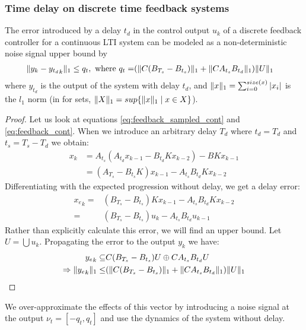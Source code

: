 \documentclass[sigconf]{llncs}
\DeclarePairedDelimiter\norm{\lVert}{\rVert}
\newcommand{\mat}[1]{{#1}}
\renewcommand{\vec}[1]{{#1}}
\begin{document}
\subsubsection{Time delay on discrete time feedback systems} \label{sec:delay}
\begin{theorem}
The error introduced by a delay $t_d$ in the control output $\vec{u}_k$ of a discrete feedback controller for a continuous LTI system can be modeled as a non-deterministic noise signal upper bound by 
\begin{align}
\norm{\vec{y}_{k}-{\vec{y}_{t_d}}_{k}}_1 \leq q_t, \text{ where } q_t=&(\norm{\mat{C}(\mat{B}_{T_s}-\mat{B}_{t_s})}_1+\norm{\mat{C}\mat{A}_{t_s}\mat{B}_{t_d}}_1)\norm{U}_1
\end{align}
where $\vec{y}_{t_d}$ is the output of the system with delay $t_d$, and $\norm{\vec{x}}_1=\sum_{i=0}^{size(\vec{x})} |\vec{x}_i|$ is the $l_1$ norm (in for sets, $\norm{X}_1 = sup \{\norm{\vec{x}}_1 \mid \vec{x} \in X\}$). 
\end{theorem}

\begin{proof}
Let us look at equations \eqref{eq:feedback_sampled_cont} and
\eqref{eq:feedback_cont}.  When we introduce an arbitrary delay $T_d$ where
$t_d=T_d$ and $t_s=T_s-T_d$ we obtain:
%
\begin{align*}
\vec{x}_{k} &=\mat{A}_{t_s}(\mat{A}_{t_d}\vec{x}_{k-1}-\mat{B}_{t_d}\mat{K}\vec{x}_{k-2})-\mat{B}\mat{K}\vec{x}_{k-1}\nonumber\\
&=  (\mat{A}_{T_s}-\mat{B}_{t_s}\mat{K})\vec{x}_{k-1}-\mat{A}_{t_s}\mat{B}_{t_d}\mat{K}\vec{x}_{k-2}
\label{eq:delay_cont}
\end{align*}
%
Differentiating with the expected progression without delay, we get a delay
error:
%
\begin{align*}
{\vec{x}_e}_{k}=&(\mat{B}_{T_s}-\mat{B}_{t_s})\mat{K}\vec{x}_{k-1}-\mat{A}_{t_s}\mat{B}_{t_d}\mat{K}\vec{x}_{k-2}\nonumber\\
=&(\mat{B}_{T_s}-\mat{B}_{t_s})\vec{u}_{k}-\mat{A}_{t_s}\mat{B}_{t_d}\vec{u}_{k-1}
\end{align*}
Rather than explicitly calculate this error, we will find an upper bound. Let $U = \bigcup \vec{u}_k$. Propagating the error to the output $\vec{y}_k$ we have:
\begin{align*}
{\vec{y}_e}_{k} \subseteq &\mat{C}(\mat{B}_{T_s}-\mat{B}_{t_s})U\oplus\mat{C}\mat{A}_{t_s}\mat{B}_{t_d}U\\
\Rightarrow \norm{{\vec{y}_e}_{k}}_1 \leq & (\norm{\mat{C}(\mat{B}_{T_s}-\mat{B}_{t_s})}_1+\norm{\mat{C}\mat{A}_{t_s}\mat{B}_{t_d}}_1)\norm{U}_1
\end{align*}
\end{proof}
We over-approximate the effects of this vector by introducing a noise signal at the output $\nu_t=[-q_t, q_t]$ and use the dynamics of the system without delay.
\end{document}
